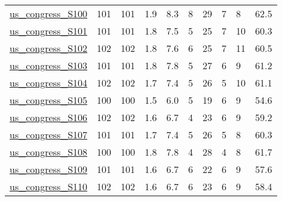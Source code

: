 \begin{longtable}{llllllllll}
 \href{https://doi.org/10.6084/m9.figshare.8096429}{us\_congress\_S100}                                                       & 101        & 101   & 1.9    & 8.3    & 8     & 29     & 7      & 8      & 62.5    \\
 \href{https://doi.org/10.6084/m9.figshare.8096429}{us\_congress\_S101}                                                       & 101        & 101   & 1.8    & 7.5    & 5     & 25     & 7      & 10     & 60.3    \\
 \href{https://doi.org/10.6084/m9.figshare.8096429}{us\_congress\_S102}                                                       & 102        & 102   & 1.8    & 7.6    & 6     & 25     & 7      & 11     & 60.5    \\
 \href{https://doi.org/10.6084/m9.figshare.8096429}{us\_congress\_S103}                                                       & 101        & 101   & 1.8    & 7.8    & 5     & 27     & 6      & 9      & 61.2    \\
 \href{https://doi.org/10.6084/m9.figshare.8096429}{us\_congress\_S104}                                                       & 102        & 102   & 1.7    & 7.4    & 5     & 26     & 5      & 10     & 61.1    \\
 \href{https://doi.org/10.6084/m9.figshare.8096429}{us\_congress\_S105}                                                       & 100        & 100   & 1.5    & 6.0    & 5     & 19     & 6      & 9      & 54.6    \\
 \href{https://doi.org/10.6084/m9.figshare.8096429}{us\_congress\_S106}                                                       & 102        & 102   & 1.6    & 6.7    & 4     & 23     & 6      & 9      & 59.2    \\
 \href{https://doi.org/10.6084/m9.figshare.8096429}{us\_congress\_S107}                                                       & 101        & 101   & 1.7    & 7.4    & 5     & 26     & 5      & 8      & 60.3    \\
 \href{https://doi.org/10.6084/m9.figshare.8096429}{us\_congress\_S108}                                                       & 100        & 100   & 1.8    & 7.8    & 4     & 28     & 4      & 8      & 61.7    \\
 \href{https://doi.org/10.6084/m9.figshare.8096429}{us\_congress\_S109}                                                       & 101        & 101   & 1.6    & 6.7    & 6     & 22     & 6      & 9      & 57.6    \\
 \href{https://doi.org/10.6084/m9.figshare.8096429}{us\_congress\_S110}                                                       & 102        & 102   & 1.6    & 6.7    & 6     & 23     & 6      & 9      & 58.4    \\

\end{longtable}
